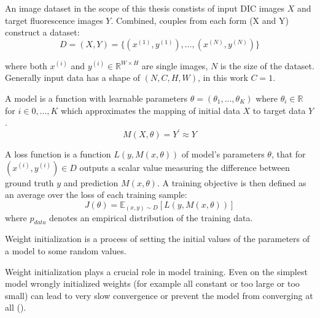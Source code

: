 \begin{definition}
	An image dataset in the scope of this thesis constists of input DIC images $X$ and target fluorescence images $Y$. Combined, couples from each form (X and Y) construct a dataset:
	\begin{equation}
		D = (X, Y) = \{(x^{(1)}, y^{(1)}), \dots, (x^{(N)}, y^{(N)})\}
	\end{equation}

	where both $x^{(i)}$ and $y^{(i)} \in \mathbb{R}^{W \times H}$ are single images, $N$ is the size of the dataset. Generally input data has a shape of $(N, C, H, W)$, in this work $C = 1$.
\end{definition}

\begin{definition}[Model]
	A model is a function with learnable parameters $\theta = (\theta_1, ..., \theta_K)$ where $\theta_i \in \mathbb{R}$ for $i \in {0, ..., K}$ which approximates the mapping of initial data $X$ to target data $Y$.
	\begin{equation}
		M(X,\theta) = Y^\prime \approx Y 
	\end{equation}
\end{definition}

\begin{definition}
	A loss function is a function $L(y, M(x, \theta))$ of model's parameters $\theta$, that for $(x^{(i)}, y^{(i)}) \in D$ outputs a scalar value measuring the difference between ground truth $y$ and prediction $M(x, \theta)$. A training objective is then defined as an average over the loss of each training sample:
	\begin{equation}
		J(\theta) = \mathbb{E}_{(x, y)\sim D} \left[L(y, M(x, \theta))\right]
	\end{equation}
	where $p_{data}$ denotes an empirical distribution of the training data.
\end{definition}

\begin{definition}
	Weight initialization is a process of setting the initial values of the parameters of a model to some random values.
\end{definition}

Weight initialization plays a crucial role in model training. Even on the simplest model wrongly initialized weights (for example all constant or too large or too small) can lead to very slow convergence or prevent the model from converging at all (\cite{Kumar_2017}).

